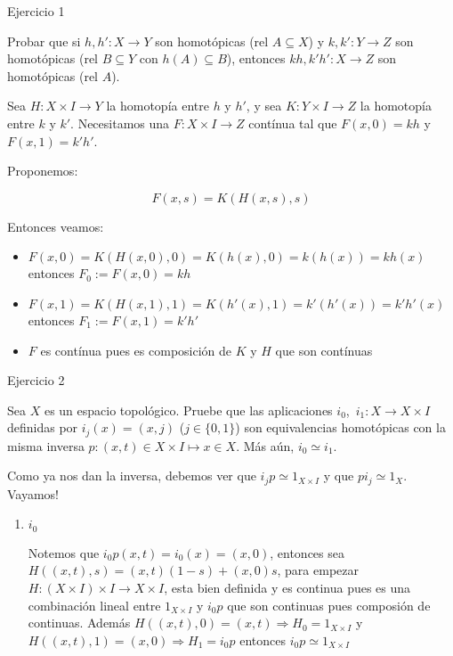 \documentclass[11pt]{article}
\newenvironment{proof}[1][Demostraci\'on]{\begin{trivlist}
\item[\hskip \labelsep {\bfseries #1}]}{\end{trivlist}}
\newcommand{\qed}{\nobreak \ifvmode \relax \else
      \ifdim\lastskip<1.5em \hskip-\lastskip
      \hskip1.5em plus0em minus0.5em \fi \nobreak
      \vrule height0.75em width0.5em depth0.25em\fi}
\begin{document}
\begin{enumerate}

\item {Ejercicio 1}

Probar que si $h,h':X\to Y$ son homot\'opicas (rel $A\subseteq X$) y $k,k':Y\to Z$ son homot\'opicas (rel $B\subseteq Y$ con $h(A)\subseteq B$),
entonces $kh,k'h':X\to Z$ son homot\'opicas (rel $A$).

\begin{proof}

Sea $H:X \times I \rightarrow Y$ la homotop\'ia entre $h$ y $h'$, y sea $K:Y \times I \rightarrow Z$ la homotop\'ia entre $k$ y $k'$. Necesitamos una $F:X \times I \rightarrow Z$ cont\'inua tal que $F(x,0)=kh$ y $F(x,1)=k'h'$.

Proponemos:

$$F(x,s) = K(H(x,s),s)$$

Entonces veamos:

\begin{itemize}
\item $F(x,0)= K(H(x,0),0) = K(h(x),0)=k(h(x)) = kh(x)$ entonces $F_0 := F(x,0) = kh$
\item $F(x,1)= K(H(x,1),1) = K(h'(x),1)=k'(h'(x)) = k'h'(x)$ entonces $F_1 := F(x,1) = k'h'$
\item $F$ es cont\'inua pues es composici\'on de $K$ y $H$ que son cont\'inuas \qed
\end{itemize}

\end{proof}

\item {Ejercicio 2}

Sea $X$ es un espacio topol\'ogico. Pruebe que las aplicaciones $i_0$,~$i_1:X\to X\times I$
definidas por $i_j(x)=(x,j)$ ($j\in\{0,1\}$) son
equivalencias homot\'opicas con la misma inversa $p:(x,t)\in X\times I\mapsto
x\in X$. M\'as a\'un, $i_0\simeq i_1$.

\begin{proof}

Como ya nos dan la inversa, debemos ver que $i_jp \simeq 1_{X \times I}$ y que $pi_j \simeq 1_X$. Vayamos!

\begin{enumerate}
\item {$i_0$}

Notemos que $i_0 p (x,t) = i_0 (x) = (x,0)$, entonces sea $H((x,t),s) = (x,t)(1-s) + (x,0)s$, para empezar $H: (X \times I) \times I \rightarrow X \times I$, esta bien definida y es continua pues es una combinaci\'on lineal entre $1_{X \times I}$ y $i_0 p$ que son continuas pues composi\'on de continuas. Adem\'as $H ((x,t),0) = (x,t) \Longrightarrow H_0 = 1_{X \times I}$ y $H((x,t),1) = (x,0) \Longrightarrow H_1 = i_0p$ entonces $i_0p \simeq 1_{X\times I}$


\end{enumerate}
\end{proof}
\end{enumerate}
\end{document}
